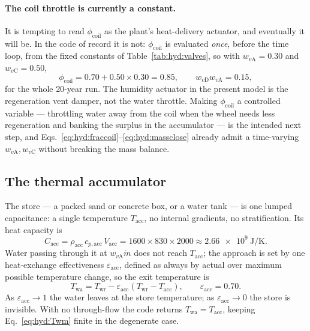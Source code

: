 \documentclass[11pt]{article}
\newcommand{\md}{\ensuremath{\dot m}}
\begin{document}
\paragraph{The coil throttle is currently a constant.} It is tempting to read
$\phi_{\mathrm{coil}}$ as the plant's heat-delivery actuator, and eventually it will be. In the
code of record it is not: $\phi_{\mathrm{coil}}$ is evaluated \emph{once}, before the time
loop, from the fixed constants of Table~\ref{tab:hyd:valves}, so with
$w_{v\mathrm{A}}=\num{0.30}$ and $w_{v\mathrm{C}}=\num{0.50}$,
\begin{equation}
\phi_{\mathrm{coil}}=0.70+0.50\times0.30=\num{0.85},
\qquad
w_{v\mathrm{D}}w_{v\mathrm{A}}=\num{0.15},
\label{eq:hyd:fracnum}
\end{equation}
for the whole \num{20}-year run. The humidity actuator in the present model is the regeneration
vent damper, not the water throttle. Making $\phi_{\mathrm{coil}}$ a controlled variable ---
throttling water away from the coil when the wheel needs less regeneration and banking the
surplus in the accumulator --- is the intended next step, and
Eqs.~\eqref{eq:hyd:fraccoil}--\eqref{eq:hyd:massclose} already admit a time-varying
$w_{v\mathrm{A}},w_{v\mathrm{C}}$ without breaking the mass balance.

\subsection{The thermal accumulator}
\label{sec:hyd:acc}

The store --- a packed sand or concrete box, or a water tank --- is one lumped capacitance: a
single temperature $T_{\mathrm{acc}}$, no internal gradients, no stratification. Its heat
capacity is
\begin{equation}
C_{\mathrm{acc}}=\rho_{\mathrm{acc}}\,c_{p,\mathrm{acc}}\,V_{\mathrm{acc}}
=\num{1600}\times\num{830}\times\num{2000}
\approx\SI{2.66e9}{\joule\per\kelvin}.
\label{eq:hyd:Cacc}
\end{equation}
Water passing through it at $w_{v\mathrm{A}}\md$ does not reach $T_{\mathrm{acc}}$; the
approach is set by one heat-exchange effectiveness $\varepsilon_{\mathrm{acc}}$, defined as
always by actual over maximum possible temperature change, so the exit temperature is
\begin{equation}
T_{\mathrm{wa}}=T_{\mathrm{wr}}-\varepsilon_{\mathrm{acc}}
\left(T_{\mathrm{wr}}-T_{\mathrm{acc}}\right),
\qquad \varepsilon_{\mathrm{acc}}=\num{0.70}.
\label{eq:hyd:Twa}
\end{equation}
As $\varepsilon_{\mathrm{acc}}\to1$ the water leaves at the store temperature; as
$\varepsilon_{\mathrm{acc}}\to0$ the store is invisible. With no through-flow the code returns
$T_{\mathrm{wa}}=T_{\mathrm{acc}}$, keeping Eq.~\eqref{eq:hyd:Twm} finite in the degenerate
case.
\end{document}
